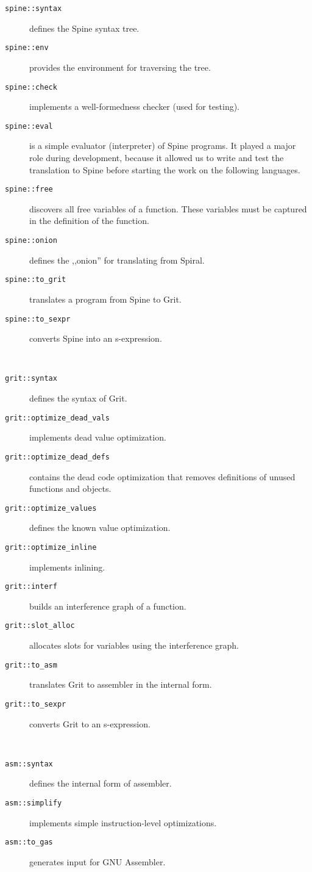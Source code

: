 \begin{description}
  \item[\texttt{spine::syntax}] defines the Spine syntax tree.
  \item[\texttt{spine::env}] provides the environment for traversing the tree.
  \item[\texttt{spine::check}] implements a well-formedness checker (used for
    testing).
  \item[\texttt{spine::eval}] is a simple evaluator (interpreter) of Spine
    programs. It played a major role during development, because it allowed
    us to write and test the translation to Spine before starting the work on
    the following languages.
  \item[\texttt{spine::free}] discovers all free variables of a function. These
    variables must be captured in the definition of the function.
  \item[\texttt{spine::onion}] defines the ,,onion'' for translating from
    Spiral.
  \item[\texttt{spine::to_grit}] translates a program from Spine to Grit.
  \item[\texttt{spine::to_sexpr}] converts Spine into an s-expression.
\end{description}
~
\begin{description}
  \item[\texttt{grit::syntax}] defines the syntax of Grit.
  \item[\texttt{grit::optimize_dead_vals}] implements dead value optimization.
  \item[\texttt{grit::optimize_dead_defs}] contains the dead code optimization
    that removes definitions of unused functions and objects.
  \item[\texttt{grit::optimize_values}] defines the known value optimization.
  \item[\texttt{grit::optimize_inline}] implements inlining.
  \item[\texttt{grit::interf}] builds an interference graph of a function.
  \item[\texttt{grit::slot_alloc}] allocates slots for variables using the
    interference graph.
  \item[\texttt{grit::to_asm}] translates Grit to assembler in the internal
    form.
  \item[\texttt{grit::to_sexpr}] converts Grit to an s-expression.
\end{description}
~
\begin{description}
  \item[\texttt{asm::syntax}] defines the internal form of assembler.
  \item[\texttt{asm::simplify}] implements simple instruction-level
    optimizations.
  \item[\texttt{asm::to_gas}] generates input for GNU Assembler.
\end{description}

